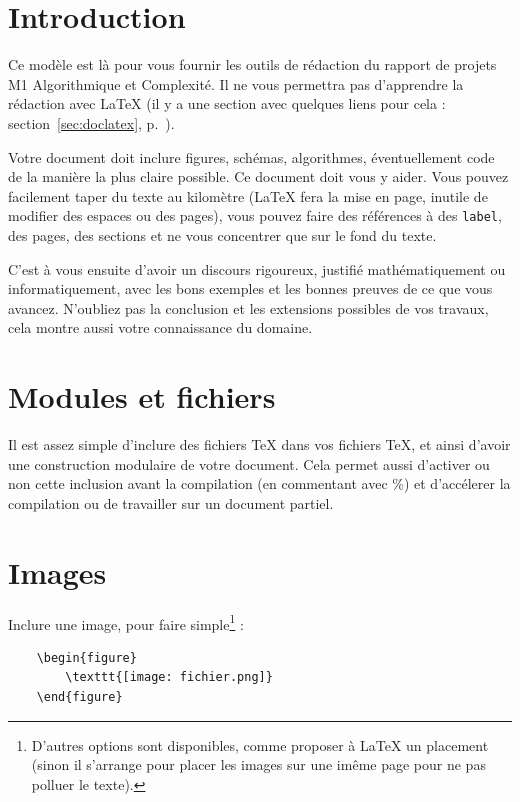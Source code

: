 \documentclass{rapportAlgoM1}
\title{\LARGE{\titreGeneral}}%
\author{\auteurA \\ \auteurB}%
\date{2022-23}
\begin{document}
\setlength{\parindent}{1cm}%


\tableofcontents
\newpage


\section{Introduction}

Ce modèle est là pour vous fournir les outils de rédaction du rapport de projets M1 Algorithmique et Complexité. Il ne vous permettra pas d'apprendre la rédaction avec \LaTeX{} (il y a une section avec quelques liens pour cela : section~\ref{sec:doclatex}, p.~\pageref{sec:doclatex}).

Votre document doit inclure figures, schémas, algorithmes, éventuellement code de la manière la plus claire possible. Ce document doit vous y aider. Vous pouvez facilement taper du texte au kilomètre (\LaTeX{} fera la mise en page, inutile de modifier des espaces ou des pages), vous pouvez faire des références à des \texttt{label}, des pages, des sections et ne vous concentrer que sur le fond du texte.

C'est à vous ensuite d'avoir un discours rigoureux, justifié mathématiquement ou informatiquement, avec les bons exemples et les bonnes preuves de ce que vous avancez. N'oubliez pas la conclusion et les extensions possibles de vos travaux, cela montre aussi votre connaissance du domaine.

\section{Modules et fichiers}
Il est assez simple d'inclure des fichiers \TeX{} dans vos fichiers \TeX{}, et ainsi d'avoir une construction modulaire de votre document. Cela permet aussi d'activer ou non cette inclusion avant la compilation (en commentant avec \%) et d'accélerer la compilation ou de travailler sur un document partiel.



\section{Images}
Inclure une image, pour faire simple\footnote{D'autres options sont disponibles, comme proposer à \LaTeX{} un placement (sinon il s'arrange pour placer les images sur une imême page pour ne pas polluer le texte).} :
\begin{verbatim}
	\begin{figure}
		\texttt{[image: fichier.png]}
	\end{figure}
\end{verbatim}
\end{document}
